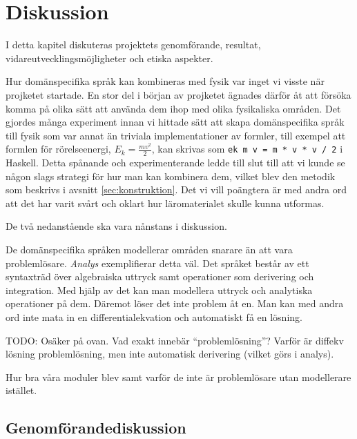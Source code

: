 
\chapter{Diskussion}

\begin{draft}

I detta kapitel diskuteras projektets genomförande, resultat, vidareutvecklingsmöjligheter och etiska aspekter.

\end{draft}

\begin{binge}

Hur domänspecifika språk kan kombineras med fysik var inget vi visste när projketet startade. En stor del i början av projketet ägnades därför åt att försöka komma på olika sätt att använda dem ihop med olika fysikaliska områden. Det gjordes många experiment innan vi hittade sätt att skapa domänspecifika språk till fysik som var annat än triviala implementationer av formler, till exempel att formlen för rörelseenergi, $E_k = \frac{mv^2}{2}$, kan skrivas som \texttt{ek m v = m * v * v / 2} i Haskell. Detta spånande och experimenterande ledde till slut till att vi kunde se någon slags strategi för hur man kan kombinera dem, vilket blev den metodik som beskrivs i avsnitt \ref{sec:konstruktion}. Det vi vill poängtera är med andra ord att det har varit svårt och oklart hur läromaterialet skulle kunna utformas.

De två nedanstående ska vara nånstans i diskussion.

De domänspecifika språken modellerar områden snarare än att vara problemlösare.
\textit{Analys} exemplifierar detta väl. Det språket består av ett syntaxträd
över algebraiska uttryck samt operationer som derivering och integration. Med
hjälp av det kan man modellera uttryck och analytiska operationer på dem.
Däremot löser det inte problem åt en. Man kan med andra ord inte mata in en
differentialekvation och automatiskt få en lösning.

TODO: Osäker på ovan. Vad exakt innebär ``problemlösning''? Varför är
diffekv lösning problemlösning, men inte automatisk derivering (vilket
görs i analys).

Hur bra våra moduler blev samt varför de inte är problemlösare utan modellerare
istället.

\section{Genomförandediskussion}


\end{binge}
